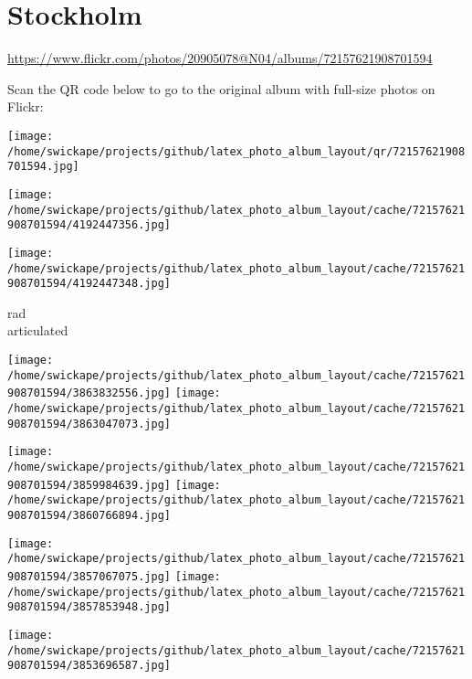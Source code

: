 \documentclass[10pt,letterpaper]{article}
\title{}
\author{}
\date{}
\begin{document}
\section*{Stockholm}

\url{https://www.flickr.com/photos/20905078@N04/albums/72157621908701594}

Scan the QR code below to go to the original album with full-size photos on Flickr:

\texttt{[image: /home/swickape/projects/github/latex\_photo\_album\_layout/qr/72157621908701594.jpg]}
\pagebreak

\texttt{[image: /home/swickape/projects/github/latex\_photo\_album\_layout/cache/72157621908701594/4192447356.jpg]}

\vspace{0.25in}
\texttt{[image: /home/swickape/projects/github/latex\_photo\_album\_layout/cache/72157621908701594/4192447348.jpg]}

rad\\
articulated
\pagebreak

\texttt{[image: /home/swickape/projects/github/latex\_photo\_album\_layout/cache/72157621908701594/3863832556.jpg]}
\texttt{[image: /home/swickape/projects/github/latex\_photo\_album\_layout/cache/72157621908701594/3863047073.jpg]}

\texttt{[image: /home/swickape/projects/github/latex\_photo\_album\_layout/cache/72157621908701594/3859984639.jpg]}
\texttt{[image: /home/swickape/projects/github/latex\_photo\_album\_layout/cache/72157621908701594/3860766894.jpg]}





\pagebreak

\texttt{[image: /home/swickape/projects/github/latex\_photo\_album\_layout/cache/72157621908701594/3857067075.jpg]}
\texttt{[image: /home/swickape/projects/github/latex\_photo\_album\_layout/cache/72157621908701594/3857853948.jpg]}

\vspace{0.25in}
\texttt{[image: /home/swickape/projects/github/latex\_photo\_album\_layout/cache/72157621908701594/3853696587.jpg]}
\end{document}
